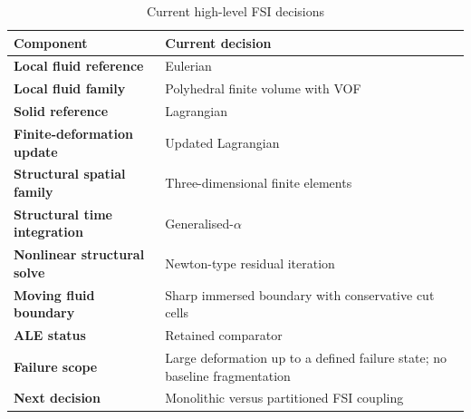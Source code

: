 \documentclass[11pt,a4paper]{article}
\begin{document}
\begin{table}[htbp]
\centering
\begin{tabularx}{\textwidth}{>{\bfseries}p{}X}
\toprule
Component & Current decision \\
\midrule
Local fluid reference & Eulerian \\
Local fluid family & Polyhedral finite volume with VOF \\
Solid reference & Lagrangian \\
Finite-deformation update & Updated Lagrangian \\
Structural spatial family & Three-dimensional finite elements \\
Structural time integration & Generalised-\(\alpha\) \\
Nonlinear structural solve & Newton-type residual iteration \\
Moving fluid boundary & Sharp immersed boundary with conservative cut cells \\
ALE status & Retained comparator \\
Failure scope & Large deformation up to a defined failure state; no baseline fragmentation \\
Next decision & Monolithic versus partitioned FSI coupling \\
\bottomrule
\end{tabularx}
\caption{Current high-level FSI decisions}
\label{tab:decision-summary}
\end{table}

\printbibliography
\end{document}

